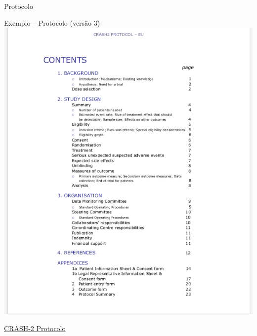 \documentclass{beamer}
\begin{document}
\begin{frame}{Protocolo}
  \begin{exampleblock}{Exemplo -- Protocolo (versão 3)}
    \centering
    \includegraphics[height=.8\textheight]{Planejamento/CRASH-proto2}

  \end{exampleblock}
  \vfill
  \scriptsize
  \hfill \href{http://www.crash2.lshtm.ac.uk/Protocol_Eng.html}{CRASH-2 Protocolo}
\end{frame}
\end{document}
